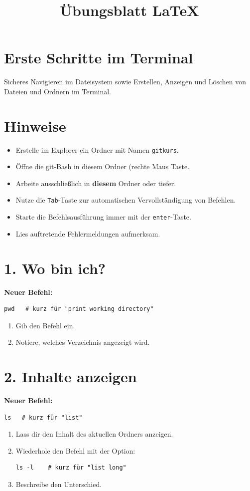 \documentclass[]{scrreprt}
\title{Übungsblatt \LaTeX}
\author{}
\date{}
\begin{document}
\section*{Erste Schritte im Terminal}
Sicheres Navigieren im Dateisystem sowie Erstellen, Anzeigen und Löschen von
Dateien und Ordnern im Terminal.

\section*{Hinweise}
\begin{itemize}
  \item Erstelle im Explorer ein Ordner mit Namen \texttt{gitkurs}.
  \item Öffne die git-Bash in diesem Ordner (rechte Maus Taste.
  \item Arbeite ausschließlich in \textbf{diesem} Ordner oder tiefer.
  \item Nutze die \texttt{Tab}-Taste zur automatischen Vervollständigung von Befehlen.
  \item Starte die Befehlsausführung immer mit der \texttt{enter}-Taste.
  \item Lies auftretende Fehlermeldungen aufmerksam.
\end{itemize}

\section*{1. Wo bin ich?}

\textbf{Neuer Befehl:}
\begin{lstlisting}
pwd   # kurz für "print working directory"
\end{lstlisting} 

\begin{enumerate}
  \item Gib den Befehl ein.
  \item Notiere, welches Verzeichnis angezeigt wird.
\end{enumerate}

\section*{2. Inhalte anzeigen}

\textbf{Neuer Befehl:}
\begin{lstlisting}
ls   # kurz für "list"
\end{lstlisting}

\begin{enumerate}
  \item Lass dir den Inhalt des aktuellen Ordners anzeigen.
  \item Wiederhole den Befehl mit der Option:
\begin{lstlisting}
ls -l    # kurz für "list long"
\end{lstlisting}
  \item Beschreibe den Unterschied.
\end{enumerate}
\end{document}
